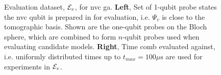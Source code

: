 \begin{figure}
    \begin{center}
        \qquad
    \end{center}
    \caption[Evaluation dataset for nitrogen-vacancy centre genetic algorithm]{
        Evaluation dataset, ${ \mathcal{E} }_v$, for \acrlong{nvc} \acrlong{ga}. 
        \textbf{Left}, Set of 1-qubit \gls{probe} states the \gls{nvc}  qubit is prepared in for evaluation, 
            i.e. $\Psi_v$ is close to the tomographic basis. 
            Shown are the one-qubit \glspl{probe} on the Bloch sphere, which are combined to form 
            $n$-qubit probes used when evaluating candidate models. 
        \textbf{Right}, Time comb evaluated against, i.e. uniformly distributed times up to $t_{max} = 100 \mu \textrm{s}$ 
            are used for \glspl{experiment} in ${ \mathcal{E} }_v$. 
        }
    \label{fig:nv_ga_eval_data}
\end{figure}    

\par 


